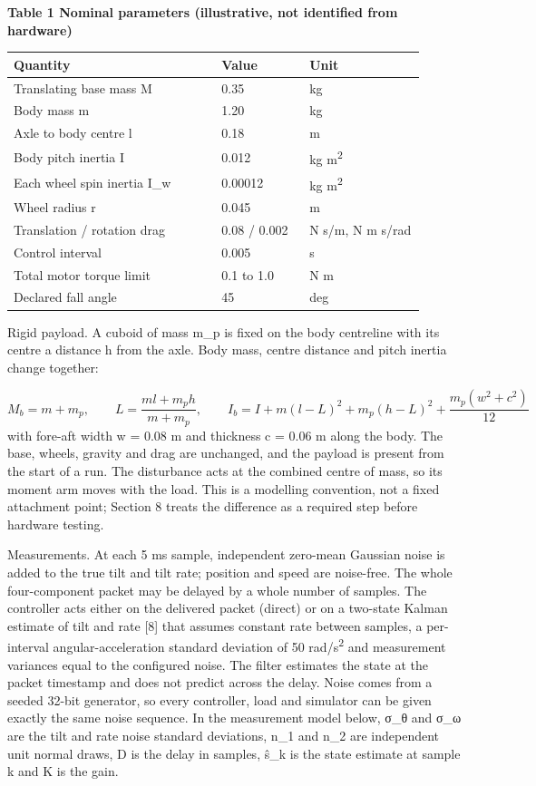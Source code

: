 \documentclass[11pt,a4paper]{article}
\begin{document}
\textbf{Table 1 Nominal parameters (illustrative, not identified from hardware)}
\begin{longtable}{p{0.45\linewidth}p{0.198\linewidth}p{0.252\linewidth}}
\toprule
Quantity & Value & Unit \\ \midrule \endhead
Translating base mass M & 0.35 & kg \\
Body mass m & 1.20 & kg \\
Axle to body centre l & 0.18 & m \\
Body pitch inertia I & 0.012 & kg m\textsuperscript{2} \\
Each wheel spin inertia I\_w & 0.00012 & kg m\textsuperscript{2} \\
Wheel radius r & 0.045 & m \\
Translation / rotation drag & 0.08 / 0.002 & N s/m, N m s/rad \\
Control interval & 0.005 & s \\
Total motor torque limit & 0.1 to 1.0 & N m \\
Declared fall angle & 45 & deg \\
\bottomrule
\end{longtable}
Rigid payload. A cuboid of mass m\_p is fixed on the body centreline with its centre a distance h from the axle. Body mass, centre distance and pitch inertia change together:

\begin{equation}M_b=m+m_p,\qquad L=\frac{ml+m_ph}{m+m_p},\qquad I_b=I+m(l-L)^2+m_p(h-L)^2+\frac{m_p(w^2+c^2)}{12}\end{equation}
with fore-aft width w = 0.08 m and thickness c = 0.06 m along the body. The base, wheels, gravity and drag are unchanged, and the payload is present from the start of a run. The disturbance acts at the combined centre of mass, so its moment arm moves with the load. This is a modelling convention, not a fixed attachment point; Section 8 treats the difference as a required step before hardware testing.

Measurements. At each 5 ms sample, independent zero-mean Gaussian noise is added to the true tilt and tilt rate; position and speed are noise-free. The whole four-component packet may be delayed by a whole number of samples. The controller acts either on the delivered packet (direct) or on a two-state Kalman estimate of tilt and rate [8] that assumes constant rate between samples, a per-interval angular-acceleration standard deviation of 50 rad/s\textsuperscript{2} and measurement variances equal to the configured noise. The filter estimates the state at the packet timestamp and does not predict across the delay. Noise comes from a seeded 32-bit generator, so every controller, load and simulator can be given exactly the same noise sequence. In the measurement model below, σ\_θ and σ\_ω are the tilt and rate noise standard deviations, n\_1 and n\_2 are independent unit normal draws, D is the delay in samples, ŝ\_k is the state estimate at sample k and K is the gain.
\end{document}
